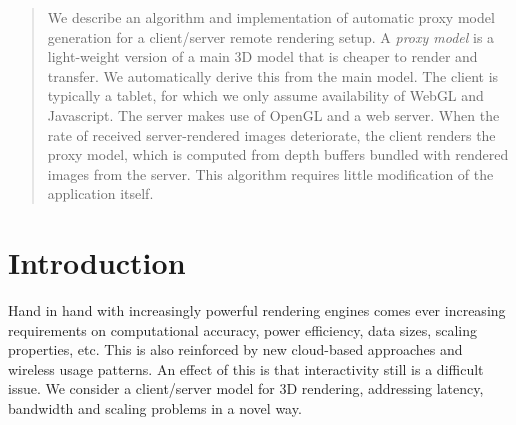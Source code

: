 \maketitle

\begin{abstract}
   We describe an algorithm and implementation of automatic proxy model
   generation for a client/server remote rendering setup. A {\em proxy model} is
   a light-weight version of a main 3D model that is cheaper to render and transfer. We
   automatically derive this from the main model. The client is typically a
   tablet, for which we only assume availability of WebGL and Javascript. The
   server makes use of OpenGL and a web server. When the rate of received
   server-rendered images deteriorate, the client renders the proxy model, which
   is computed from depth buffers bundled with rendered images from the
   server. This algorithm requires little modification of the application
   itself.

\begin{classification} %
\end{classification}

\end{abstract}




\section{Introduction}

Hand in hand with increasingly powerful rendering engines comes ever increasing
requirements on computational accuracy, power efficiency, data sizes, scaling
properties, etc. This is also reinforced by new cloud-based approaches and
wireless usage patterns. An effect of this is that interactivity still is a
difficult issue. We consider a client/server model for 3D rendering, addressing
latency, bandwidth and scaling problems in a novel way.

